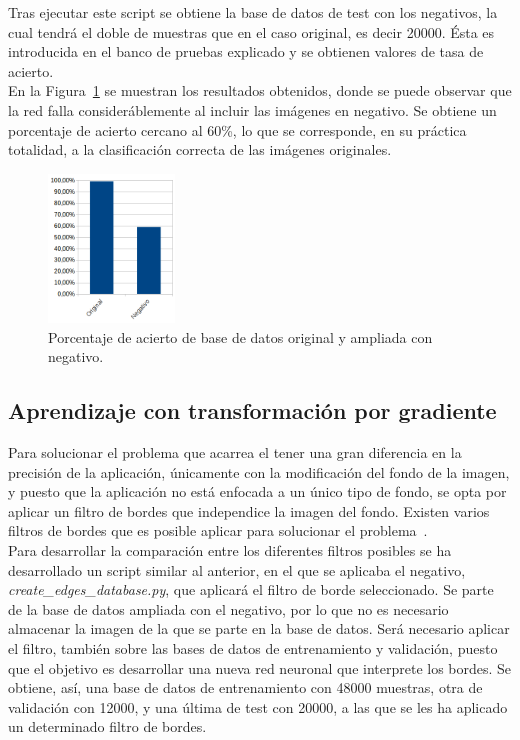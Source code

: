Tras ejecutar este script se obtiene la base de datos de test con los negativos, la cual tendrá el doble de muestras que en el caso original, es decir 20000. Ésta es introducida en el banco de pruebas explicado y se obtienen valores de tasa de acierto.\\

En la Figura~\ref{fig.neg-orig} se muestran los resultados obtenidos, donde se puede observar que la red falla consideráblemente al incluir las imágenes en negativo. Se obtiene un porcentaje de acierto cercano al 60\%, lo que se corresponde, en su práctica totalidad, a la clasificación correcta de las imágenes originales.

\begin{figure}[H]
	\begin{center}
		\includegraphics[width=0.3\textwidth]{figures/orig_neg}
		\caption{Porcentaje de acierto de base de datos original y ampliada con negativo.}
		\label{fig.neg-orig}
	\end{center}
\end{figure}

\subsection{Aprendizaje con transformación por gradiente}
\label{sec.bordes}
Para solucionar el problema que acarrea el tener una gran diferencia en la precisión de la aplicación, únicamente con la modificación del fondo de la imagen, y puesto que la aplicación no está enfocada a un único tipo de fondo, se opta por aplicar un filtro de bordes que independice la imagen del fondo. Existen varios filtros de bordes que es posible aplicar para solucionar el problema~\cite{fundamentos}.\\

Para desarrollar la comparación entre los diferentes filtros posibles se ha desarrollado un script similar al anterior, en el que se aplicaba el negativo, \textit{create\_edges\_database.py}, que aplicará el filtro de borde seleccionado. Se parte de la base de datos ampliada con el negativo, por lo que no es necesario almacenar la imagen de la que se parte en la base de datos. Será necesario aplicar el filtro, también sobre las bases de datos de entrenamiento y validación, puesto que el objetivo es desarrollar una nueva red neuronal que interprete los bordes. Se obtiene, así, una base de datos de entrenamiento con 48000 muestras, otra de validación con 12000, y una última de test con 20000, a las que se les ha aplicado un determinado filtro de bordes.\\

